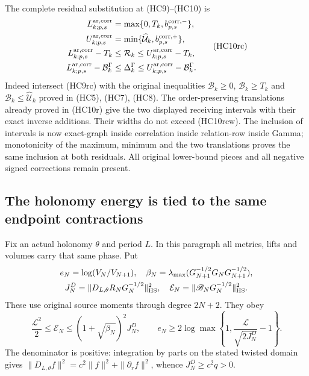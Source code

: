 The complete residual substitution at (HC9)--(HC10) is
\[
\begin{aligned}
 L_{k;p,s}^{\rm ar,corr}&=\max\{0,T_k,b_{p,s}^{\rm corr,-}\},\\
 U_{k;p,s}^{\rm ar,corr}&=\min\{\widehat{\mathcal U}_k,b_{p,s}^{\rm corr,+}\},\\
 L_{k;p,s}^{\rm ar,corr}-T_k
 &\leq\mathcal R_k\leq U_{k;p,s}^{\rm ar,corr}-T_k,\\
 L_{k;p,s}^{\rm ar,corr}-\mathcal B_k^\Gamma
 &\leq\Delta_k^\Gamma
                    \leq U_{k;p,s}^{\rm ar,corr}-\mathcal B_k^\Gamma.
\end{aligned}\tag{HC10rc}
\]
Indeed intersect (HC9rc) with the original inequalities
$\mathcal B_k\geq0$, $\mathcal B_k\geq T_k$ and
$\mathcal B_k\leq\widehat{\mathcal U}_k$ proved in (HC5),
(HC7), (HC8). The order-preserving translations already proved
in (HC10r) give the two displayed receiving intervals with their
exact inverse additions. Their widths do not exceed (HC10rcw).
The inclusion of intervals is now exact-graph inside correlation
inside relation-row inside Gamma; monotonicity of the maximum,
minimum and the two translations proves the same inclusion
at both residuals. All original lower-bound pieces and all
negative signed corrections remain present.


\subsection{The holonomy energy is tied to the same endpoint contractions}

Fix an actual holonomy $\theta$ and period $L$.  In this paragraph all
metrics, lifts and volumes carry that same phase.  Put
\[
 \begin{gathered}
 e_N=\log(V_N/V_{N+1}),\quad
 \beta_N=\lambda_{\max}
 (G_{N+1}^{-1/2}G_NG_{N+1}^{-1/2}),\\
 J_N^{D}=\|D_{L,\theta}R_NG_N^{-1/2}\|_{\rm HS}^{2},\quad
 \mathcal E_N=\|\mathscr B_NG_N^{-1/2}\|_{\rm HS}^{2}.
 \end{gathered}
\]
These use original source moments through degree $2N+2$.  They obey
\[
 \boxed{
 \frac{\mathcal L^2}{2}\leq\mathcal E_N
 \leq(1+\sqrt{\beta_N})^2J_N^D,
 \qquad
 e_N\geq2\log\max\left\{1,
 \frac{\mathcal L}{\sqrt{2J_N^D}}-1\right\}.}
 \tag{HC12}
\]
The denominator is positive: integration by parts on the stated
twisted domain gives
$\|D_{L,\theta}f\|^2=c^2\|f\|^2+\|\partial_rf\|^2$, whence
$J_N^D\geq c^2q>0$.

